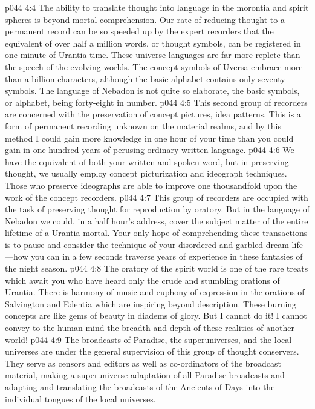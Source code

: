 \vs p044 4:4 The ability to translate thought into language in the morontia and spirit spheres is beyond mortal comprehension. Our rate of reducing thought to a permanent record can be so speeded up by the expert recorders that the equivalent of over half a million words, or thought symbols, can be registered in one minute of Urantia time. These universe languages are far more replete than the speech of the evolving worlds. The concept symbols of Uversa embrace more than a billion characters, although the basic alphabet contains only seventy symbols. The language of Nebadon is not quite so elaborate, the basic symbols, or alphabet, being forty\hyp{}eight in number.\plusone
\pc \vs p044 4:5 \bibnobreakspace {} This second group of recorders are concerned with the preservation of concept pictures, idea patterns. This is a form of permanent recording unknown on the material realms, and by this method I could gain more knowledge in one hour of your time than you could gain in one hundred years of perusing ordinary written language.
\pc \vs p044 4:6 \bibnobreakspace {} We have the equivalent of both your written and spoken word, but in preserving thought, we usually employ concept picturization and ideograph techniques. Those who preserve ideographs are able to improve one thousandfold upon the work of the concept recorders.
\pc \vs p044 4:7 \bibnobreakspace {} This group of recorders are occupied with the task of preserving thought for reproduction by oratory. But in the language of Nebadon we could, in a half hour’s address, cover the subject matter of the entire lifetime of a Urantia mortal. Your only hope of comprehending these transactions is to pause and consider the technique of your disordered and garbled dream life---how you can in a few seconds traverse years of experience in these fantasies of the night season.
\vs p044 4:8 The oratory of the spirit world is one of the rare treats which await you who have heard only the crude and stumbling orations of Urantia. There is harmony of music and euphony of expression in the orations of Salvington and Edentia which are inspiring beyond description. These burning concepts are like gems of beauty in diadems of glory. But I cannot do it! I cannot convey to the human mind the breadth and depth of these realities of another world!
\pc \vs p044 4:9 \bibnobreakspace {} The broadcasts of Paradise, the superuniverses, and the local universes are under the general supervision of this group of thought conservers. They serve as censors and editors as well as co\hyp{}ordinators of the broadcast material, making a superuniverse adaptation of all Paradise broadcasts and adapting and translating the broadcasts of the Ancients of Days into the individual tongues of the local universes.
